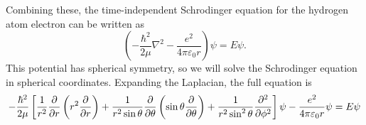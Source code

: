 \documentclass[../quantum_mechanics.tex]{subfiles}
\begin{document}
            Combining these, the time-independent Schrodinger equation for the hydrogen atom electron can be written as
            \begin{equation}
                \left(-\frac{\hbar^2}{2\mu}\nabla^2-\frac{e^2}{4\pi\varepsilon_0 r}\right)\psi=E\psi.
            \end{equation}
            This potential has spherical symmetry, so we will solve the Schrodinger equation in spherical coordinates.
            Expanding the Laplacian, the full equation is
            \begin{equation}\label{eq:hydrogen-tise-expanded}
                -\frac{\hbar^2}{2\mu}\left[\frac{1}{r^2}\pdv{}{r}\left(r^2\pdv{}{r}\right)+\frac{1}{r^2\sin\theta}\pdv{}{\theta}\left(\sin\theta\pdv{}{\theta}\right)+\frac{1}{r^2\sin^2\theta}\pdv[2]{}{\phi}\right]\psi-\frac{e^2}{4\pi\varepsilon_0 r}\psi=E\psi
            \end{equation}
\end{document}
